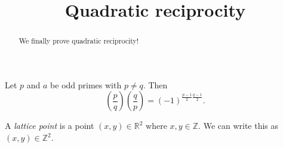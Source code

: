 \documentclass{ximera}
\title{Quadratic reciprocity}
\begin{document}
  
\begin{abstract}  
We finally prove quadratic reciprocity!\end{abstract}  
\maketitle  

\begin{theorem}
 Let $p$ and $a$ be odd primes with $p\neq q$. Then \[\left(\frac{p}{q}\right)\left(\frac{q}{p}\right)=(-1)^{\frac{p-1}{2}\frac{q-1}{2}}.\]
\end{theorem}

\begin{definition}
 A \emph{lattice point} is a point $(x,y)\in\mathbb{R}^2$ where $x,y\in\mathbb{Z}$. We can write this as $(x,y)\in\mathbb{Z}^2$.
\end{definition}
\end{document}
